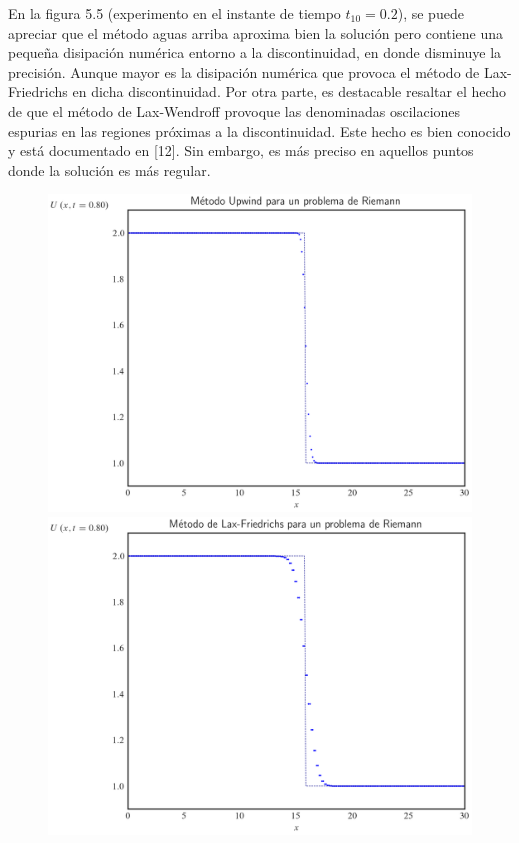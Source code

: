 En la figura 5.5 (experimento en el instante de tiempo $t_10=0.2$),
se puede apreciar que el método aguas arriba aproxima bien la
solución pero contiene una pequeña disipación numérica entorno a la
discontinuidad, en donde disminuye la precisión.
Aunque mayor es la disipación numérica que provoca el método de
Lax-Friedrichs en dicha discontinuidad.
Por otra parte, es destacable resaltar el hecho de que el método de
Lax-Wendroff provoque las denominadas oscilaciones espurias en las
regiones próximas a la discontinuidad.
Este hecho es bien conocido y está documentado en [12].
Sin embargo, es más preciso en aquellos puntos donde la solución es
más regular.

\begin{figure}[ht!]
    \centering
    \includegraphics[width=.3\paperwidth]{../snapshots/upwindheaviside1d-40.png}
    \includegraphics[width=.3\paperwidth]{../snapshots/lax-friedrichsheaviside1d-40.png}

\end{figure}
